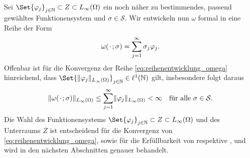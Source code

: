 Sei $\Set{ \varphi_{j} }_{j \in \mathbb{N}} \subset Z \subset L_{\infty}(\Omega)$ ein noch näher zu bestimmendes, passend gewähltes Funktionensystem und $\sigma \in \mathcal S$.
Wir entwickeln nun $\omega$ formal in eine Reihe der Form
\begin{equation}
    \label{eq:reihenentwicklung_omega}
    \omega(\blank; \sigma) = \sum_{j = 1}^{\infty} \sigma_{j} \varphi_{j}.
\end{equation}
Offenbar ist für die Konvergenz der Reihe \eqref{eq:reihenentwicklung_omega} hinreichend, dass $\Set{ \norm{\varphi_{j}}_{L_{\infty}(\Omega)} }_{j \in \mathbb{N}} \in \ell^{1}(\mathbb{N})$ gilt, insbesondere folgt daraus
\begin{equation}
    \norm{\omega(\blank; \sigma)}_{L_{\infty}(\Omega)} \leq \sum_{j = 1}^{\infty} \norm{\varphi_{j}}_{L_{\infty}(\Omega)} < \infty \quad \fa \sigma \in \mathcal S.
\end{equation}
Die Wahl des Funktionensystems $\Set{ \varphi_{j} }_{j \in \mathbb{N}} \subset Z \subset L_{\infty}(\Omega)$ und des Unterraums $Z$ ist entscheidend für die Konvergenz von \eqref{eq:reihenentwicklung_omega}, sowie für die Erfüllbarkeit von  respektive ,
und wird in den nächsten Abschnitten genauer behandelt.



